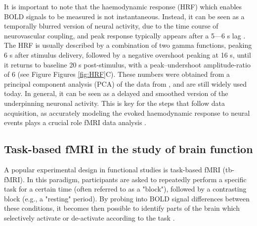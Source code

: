 It is important to note that the haemodynamic response (HRF) which enables BOLD signals to be measured is not instantaneous. Instead, it can be seen as a temporally blurred version of neural activity, due to the time course of neurovascular coupling, and peak response typically appears after a 5---6 s lag \citep{Menon2001,Logothetis2001}. The HRF is usually described by a combination of two gamma functions, peaking 6 s after stimulus delivery, followed by a negative overshoot peaking at 16 s, until it returns to baseline 20 s post-stimulus, with a peak–undershoot amplitude-ratio of 6 (see Figure Figures \ref{fig:HRF}C). These numbers were obtained from a principal component analysis (PCA) of the data from \citet{Friston1998}, and are still widely used today. In general, it can be seen as a delayed and smoothed version of the underpinning neuronal activity. This is key for the steps that follow data acquisition, as accurately modeling the evoked haemodynamic response to neural events plays a crucial role fMRI data analysis \citep{Lindquist2009}.










   
 




\subsection{Task-based fMRI in the study of brain function}

A popular experimental design in functional studies is task-based fMRI (tb-fMRI). In this paradigm, participants are asked to repeatedly perform a specific task for a certain time (often referred to as a "block"), followed by a contrasting block (e.g., a "resting" period). By probing into BOLD signal differences between these conditions, it becomes then possible to identify parts of the brain which selectively activate or de-activate according to the task \citep{Friston1995a}.

